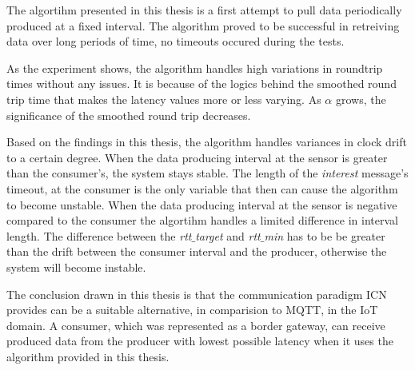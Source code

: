 The algortihm presented in this thesis is a first attempt to pull data periodically produced at a fixed interval. The algorithm proved to be successful in retreiving data over long periods of time, no timeouts occured during the tests. %

As the experiment shows, the algorithm handles high variations in roundtrip times without any issues. It is because of the logics behind the smoothed round trip time that makes the latency values more or less varying. As $\alpha$ grows, the significance of the smoothed round trip decreases. 

Based on the findings in this thesis, the algorithm handles variances in clock drift to a certain degree. When the data producing interval at the sensor is greater than the consumer's, the system stays stable. The length of the \textit{interest} message's timeout, at the consumer is the only variable that then can cause the algorithm to become unstable. When the data producing interval at the sensor is negative compared to the consumer the algortihm handles a limited difference in interval length. The difference between the \textit{rtt$\_$target} and \textit{rtt$\_$min} has to be be greater than the drift between the consumer interval and the producer, otherwise the system will become instable.

The conclusion drawn in this thesis is that the communication paradigm ICN provides can be a suitable alternative, in comparision to MQTT, in the IoT domain. A consumer, which was represented as a border gateway, can receive produced data from the producer with lowest possible latency when it uses the algorithm provided in this thesis. 






